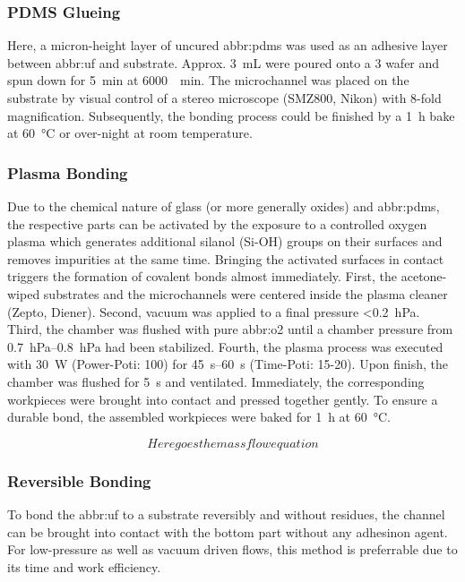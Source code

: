 \subsubsection{PDMS Glueing}
Here, a micron-height layer of uncured \gls{abbr:pdms} was used as an adhesive layer between \gls{abbr:uf} and substrate. Approx. \SI{3}{\milli\liter} were poured onto a \SI{3}{\inch} wafer and spun down for \SI{5}{\minute} at \SI{6000}{\per\minute}. The microchannel was placed on the substrate by visual control of a stereo microscope (SMZ800, Nikon) with 8-fold magnification. Subsequently, the bonding process could be finished by a \SI{1}{\hour} bake at \SI{60}{\degreeCelsius} or over-night at room temperature.
\subsubsection{Plasma Bonding}
Due to the chemical nature of glass (or more generally oxides) and \gls{abbr:pdms}, the respective parts can be activated by the exposure to a controlled oxygen plasma which generates additional silanol (Si-OH) groups on their surfaces and removes impurities at the same time. Bringing the activated surfaces in contact triggers the formation of covalent bonds almost immediately. First, the acetone-wiped substrates and the microchannels were centered inside the plasma cleaner (Zepto, Diener). Second, vacuum was applied to a final pressure <\SI{0.2}{\hecto\pascal}. Third, the chamber was flushed with pure \gls{abbr:o2} until a chamber pressure from \SIrange{0.7}{0.8}{\hecto\pascal} had been stabilized. Fourth, the plasma process was executed with \SI{30}{\watt} (Power-Poti: 100) for \SIrange{45}{60}{\second} (Time-Poti: 15-20). Upon finish, the chamber was flushed for \SI{5}{\second} and ventilated. Immediately, the corresponding workpieces were brought into contact and pressed together gently. To ensure a durable bond, the assembled workpieces were baked for \SI{1}{\hour} at \SI{60}{\degreeCelsius}.

\begin{equation}
	Here goes the mass flow equation
\end{equation}

\subsubsection{Reversible Bonding}
To bond the \gls{abbr:uf} to a substrate reversibly and without residues, the channel can be brought into contact with the bottom part without any adhesinon agent. For low-pressure as well as vacuum driven flows, this method is preferrable due to its time and work efficiency.

